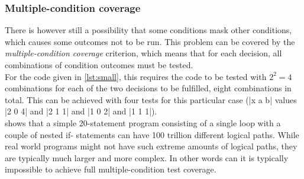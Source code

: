 \subsubsection{Multiple-condition coverage}

There is however still a possibility that some conditions mask other
conditions, which causes some outcomes not to be run. This problem can
be covered by the \emph{multiple-condition coverage} criterion, which
means that for each decision, all combinations of condition outcomes
must be tested.\\

For the code given in \ref{lst:small}, this requires the code to be
tested with $2^2 = 4$ combinations for each of the two decisions to be
fulfilled, eight combinations in total. This can be achieved with four
tests for this particular case (|x a b| values |2 0 4| and |2 1 1| and
|1 0 2| and |1 1 1|).\\

\citeauthor{book:art_of_testing} shows that a simple 20-statement
program consisting of a single loop with a couple of nested if-
statements can have 100 trillion different logical paths. While real
world programs might not have such extreme amounts of logical paths,
they are typically much larger and more complex. In other words can it
is typically impossible to achieve full multiple-condition test
coverage.\\
